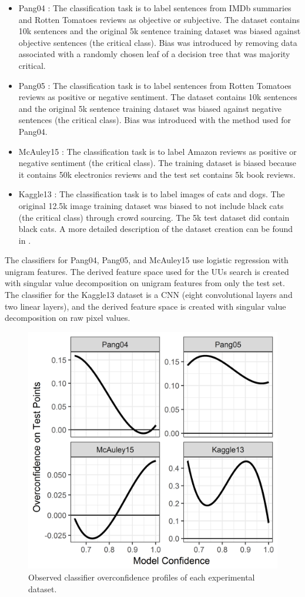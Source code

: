 \documentclass[letterpaper]{article} %
\begin{document}
\begin{itemize}
\item Pang04 \citep{pang2004}: The classification task is to label sentences from IMDb summaries and Rotten Tomatoes reviews as objective or subjective.  The dataset contains 10k sentences and the original 5k sentence training dataset was biased against objective sentences (the critical class). Bias was introduced by removing data associated with a randomly chosen leaf of a decision tree that was majority critical.  
\item Pang05 \citep{pang2005}: The classification task is to label sentences from Rotten Tomatoes reviews as positive or negative sentiment.  The dataset contains 10k sentences and the original 5k sentence training dataset was biased against negative sentences (the critical class). Bias was introduced with the method used for Pang04.  
\item McAuley15 \citep{mcauley2015}: The classification task is to label Amazon reviews as positive or negative sentiment (the critical class). The training dataset is biased because it contains 50k electronics reviews and the test set contains 5k book reviews.
\item Kaggle13 \citep{kaggle2013}: The classification task is to label images of cats and dogs.  The original 12.5k image training dataset was biased to not include black cats (the critical class) through crowd sourcing. The 5k test dataset did contain black cats. A more detailed description of the dataset creation can be found in \cite{Bansal2018}.
\end{itemize}

The classifiers for Pang04, Pang05, and McAuley15 use logistic regression with unigram features. The derived feature space used for the UUs search is created with singular value decomposition on unigram features from only the test set. The classifier for the Kaggle13 dataset is a CNN (eight convolutional layers and two linear layers), and the derived feature space is created with singular value decomposition on raw pixel values.

\begin{figure}[hbtp]
  \includegraphics[width=.45\textwidth]{../experimentsAndPlots/overconfidence.png}
  \caption{Observed classifier overconfidence profiles of each experimental dataset.}
  \label{fig:overconf}
\end{figure}
\end{document}
